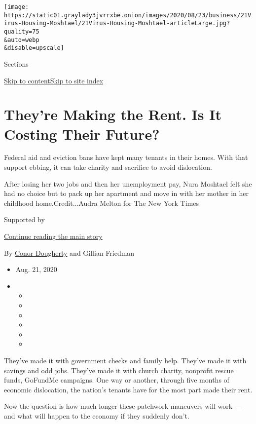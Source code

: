 \texttt{[image: https://static01.graylady3jvrrxbe.onion/images/2020/08/23/business/21Virus-Housing-Moshtael/21Virus-Housing-Moshtael-articleLarge.jpg?quality=75\\\&auto=webp\\\&disable=upscale]}

Sections

\protect\hyperlink{site-content}{Skip to
content}\protect\hyperlink{site-index}{Skip to site index}

\hypertarget{theyre-making-the-rent-is-it-costing-their-future}{%
\section{They're Making the Rent. Is It Costing Their
Future?}\label{theyre-making-the-rent-is-it-costing-their-future}}

Federal aid and eviction bans have kept many tenants in their homes.
With that support ebbing, it can take charity and sacrifice to avoid
dislocation.

After losing her two jobs and then her unemployment pay, Nura Moshtael
felt she had no choice but to pack up her apartment and move in with her
mother in her childhood home.Credit...Audra Melton for The New York
Times

Supported by

\protect\hyperlink{after-sponsor}{Continue reading the main story}

By \href{https://www.nytimes3xbfgragh.onion/by/conor-dougherty}{Conor
Dougherty} and Gillian Friedman

\begin{itemize}
\item
  Aug. 21, 2020
\item
  \begin{itemize}
  \item
  \item
  \item
  \item
  \item
  \item
  \end{itemize}
\end{itemize}

They've made it with government checks and family help. They've made it
with savings and odd jobs. They've made it with church charity,
nonprofit rescue funds, GoFundMe campaigns. One way or another, through
five months of economic dislocation, the nation's tenants have for the
most part made their rent.

Now the question is how much longer these patchwork maneuvers will work
--- and what will happen to the economy if they suddenly don't.

